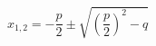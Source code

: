\documentclass[12pt]{article}
\begin{document}
\blindtext[1]

$$x_{1,2} = -\frac{p}{2} \pm \sqrt{ \left( \frac{p}{2} \right)^2 - q   } $$

\blindtext[1]
\end{document}
